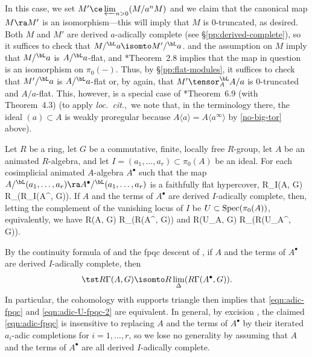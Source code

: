 In this case, we set $M' \ce \varprojlim_{n > 0} (M/a^n M)$ and we claim that the canonical map $M \ra M'$ is an isomorphism---this will imply that $M$ is $0$-truncated, as desired. Both $M$ and $M'$ are derived $a$-adically complete (see \S\ref{pp:derived-complete}), so it suffices to check that $M/^\bL a \isomto M'/^\bL a$.  and the assumption on $M$ imply that $M/^\bL a$ is $A/^\bL a$-flat, and \cite{Yek18}*{Theorem~2.8} implies that the map in question is an isomorphism on $\pi_0(-)$. Thus, by \S\ref{pp:flat-modules}, it suffices to check that $M'/^\bL a$ is $A/^\bL a$-flat or, by  again, that $M' \tensor^\bL_A A/a$ is $0$-truncated and $A/a$-flat. This, however, is a special case of \cite{Yek18}*{Theorem~6.9 (with Theorem~4.3)} (to apply \emph{loc.~cit.},~we note that, in the terminology there, the ideal $(a) \subset A$ is weakly proregular because $A\langle a \rangle = A\langle a^\infty \rangle$ by \eqref{no-big-tor} above).
\epf





\bthm \label{thm:adic-fpqc}
Let $R$ be a ring, let $G$ be a commutative, finite, locally free $R$-group, let $A$ be an animated $R$-algebra, and let $I = (a_1, \dotsc, a_r) \subset \pi_0(A)$ be  an ideal. For each cosimplicial animated $A$-algebra $A^\bullet$ such that %
the map $A/^\bL(a_1, \dotsc, a_r) \ra A^\bullet/^\bL(a_1, \dotsc, a_r)$ is a faithfully flat hypercover,
\be \label{eqn:adic-fpqc}
\tst R\Gamma_I(A, G) \isomto R\lim_\Delta(R\Gamma_I(A^\bullet, G)).
\ee
If $A$ and the terms of $A^\bullet$ are derived $I$-adically complete, then, letting the complement of the vanishing locus of $I$ be $U \subset \operatorname{Spec}(\pi_0(A))$, equivalently, we have
\be \label{eqn:adic-U-fpqc}
\tst R\Gamma(A, G) \isomto R\lim_\Delta(R\Gamma(A^\bullet, G))
\ee
and
\be \label{eqn:adic-U-fpqc-2}
\tst R\Gamma(U_A, G) \isomto R\lim_\Delta(R\Gamma(U_{A^\bullet}, G)).
\ee
\ethm

\bpf
By the continuity formula of  and the fpqc descent of , if $A$ and the terms of $A^\bullet$ are derived $I$-adically complete, then
\[
\tst R\Gamma(A, G) \isomto R\lim_\Delta(R\Gamma(A^\bullet, G)).
\]
In particular, the cohomology with supports triangle then implies that \eqref{eqn:adic-fpqc} and \eqref{eqn:adic-U-fpqc-2} are equivalent. In general, by excision , the claimed \eqref{eqn:adic-fpqc} is insensitive to replacing $A$ and the terms of $A^\bullet$ by their iterated $a_i$-adic completions for $i = 1, \dotsc, r$, so we lose no generality by assuming that $A$ and the terms of $A^\bullet$ are all derived $I$-adically complete.


